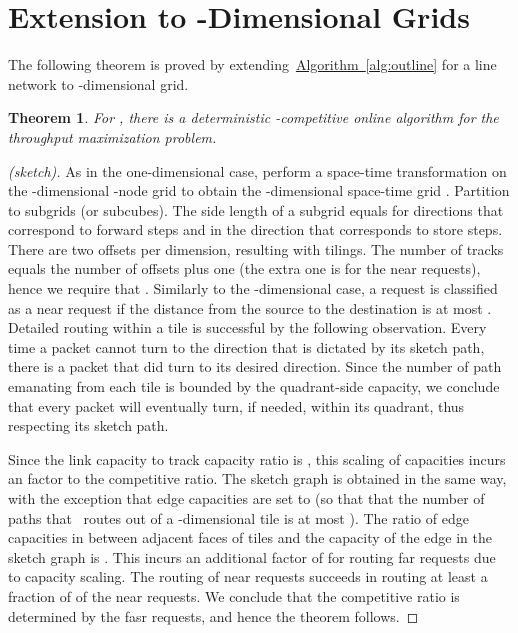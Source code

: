 \documentclass[11pt]{article}
\newtheorem{theorem}{Theorem}
\newcommand{\namedref}[2]{\hyperref[#2]{#1~\ref*{#2}}}
\newcommand{\Algref}[1]{\namedref{Algorithm}{#1}}
\newcommand{\route}{\text{\sc{ipp}}\xspace}
\newcommand{\IPP}{\route}
\newenvironment{proof sketch}[1]{\noindent {\emph{Proof sketch of #1:}}}{\hfill \qed}
\begin{document}
\section{Extension to -Dimensional Grids}\label{sec:d dim}

The following theorem is proved by extending~\Algref{alg:outline} for a
line network to -dimensional grid.
\begin{theorem}\label{thm:d dim}
  For , there is a deterministic -competitive online algorithm for the throughput maximization problem.
\end{theorem}
\begin{proof}[(sketch)]
  As in the one-dimensional case, perform a space-time transformation on the
  -dimensional -node grid  to obtain the -dimensional space-time grid
  . Partition  to  subgrids (or
  subcubes). The side length of a subgrid equals  for directions that correspond
  to forward steps and  in the direction that corresponds to store steps.  There
  are two offsets per dimension, resulting with  tilings. The number of
  tracks equals the number of offsets plus one (the extra one is for the near requests), hence we
  require that .  Similarly to the -dimensional case, a
  request is classified as a near request if the distance from the source to the
  destination is at most .  Detailed routing within a tile is successful
  by the following observation. Every time a packet cannot turn to the direction that
  is dictated by its sketch path, there is a packet that did turn to its desired direction.
  Since the number of path emanating from each tile is bounded by the quadrant-side
  capacity, we conclude that every packet will eventually turn, if needed, within its
  quadrant, thus respecting its sketch path.

  Since the link capacity to track capacity ratio is , this scaling of
  capacities incurs an   factor to the competitive ratio.  The
  sketch graph is obtained in the same way, with the exception that edge capacities
  are set to  (so that that the number of paths that \IPP\ routes out
  of a -dimensional tile is at most ). The ratio of edge capacities
  in  between adjacent faces of tiles and the capacity of the edge in the
  sketch graph is . This incurs an additional factor of 
  for routing far requests due to capacity scaling.
The routing of near requests succeeds in routing at least a fraction of  of the near requests. We conclude that the competitive ratio is determined by the
fasr requests, and hence the theorem follows.
\end{proof}
\end{document}
